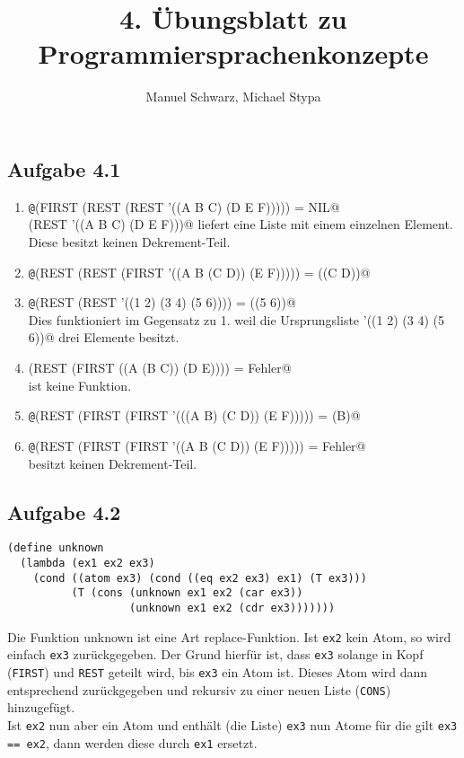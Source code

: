 \documentclass[a4paper, 12pt]{article}
\title{4. Übungsblatt zu Programmiersprachenkonzepte}
\author{Manuel Schwarz, Michael Stypa}
\begin{document}
\maketitle

\subsection*{Aufgabe 4.1}
\begin{enumerate}
  \item \texttt
        @(FIRST (REST (REST '((A B C) (D E F))))) = NIL@ \\
        \texttt@(REST '((A B C) (D E F)))@ liefert eine
        Liste mit einem einzelnen Element.
        Diese besitzt keinen Dekrement-Teil.
  \item \texttt
        @(REST (REST (FIRST '((A B (C D)) (E F))))) = ((C D))@
  \item \texttt
        @(REST (REST '((1 2) (3 4) (5 6)))) = ((5 6))@ \\
        Dies funktioniert im Gegensatz zu 1. weil die Ursprungsliste
        \texttt@'((1 2) (3 4) (5 6))@ drei Elemente besitzt.
  \item \texttt@(REST (FIRST ((A (B C)) (D E)))) = Fehler@ \\
        \texttt@A@ ist keine Funktion.
  \item \texttt
        @(REST (FIRST (FIRST '(((A B) (C D)) (E F))))) = (B)@
  \item \texttt
        @(REST (FIRST (FIRST '((A B (C D)) (E F))))) = Fehler@ \\
        \texttt@A@ besitzt keinen Dekrement-Teil.
\end{enumerate}

\subsection*{Aufgabe 4.2}
\begin{verbatim}
(define unknown 
  (lambda (ex1 ex2 ex3)
    (cond ((atom ex3) (cond ((eq ex2 ex3) ex1) (T ex3)))
          (T (cons (unknown ex1 ex2 (car ex3))
                   (unknown ex1 ex2 (cdr ex3)))))))
\end{verbatim}
Die Funktion unknown ist eine Art replace-Funktion. Ist \texttt{ex2} kein Atom,
so wird einfach \texttt{ex3} zurückgegeben. Der Grund hierfür ist, dass
\texttt{ex3} solange in Kopf (\texttt{FIRST}) und \texttt{REST} geteilt wird,
bis \texttt{ex3} ein Atom ist. Dieses Atom wird dann entsprechend zurückgegeben
und rekursiv zu einer neuen Liste (\texttt{CONS}) hinzugefügt.\\
Ist \texttt{ex2} nun aber ein Atom und enthält (die Liste) \texttt{ex3} nun
Atome für die gilt  \texttt{ex3 == ex2}, dann werden diese durch  \texttt{ex1}
ersetzt.\\
\end{document}
